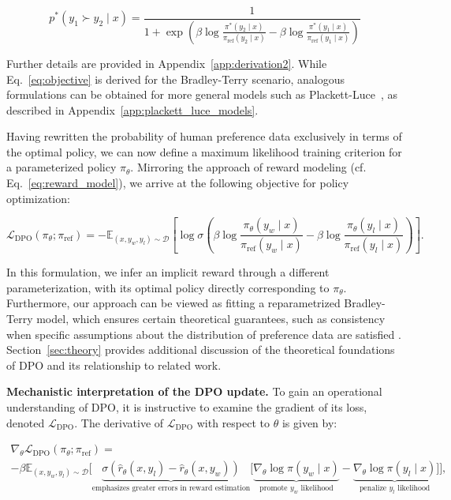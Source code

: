 \begin{equation}\label{eq:objective}
    p^*(y_1\succ y_2 \mid x)=\frac{1}{1 + \exp\left(\beta \log \frac{\pi^*(y_2\mid x)}{\pi_\text{ref}(y_2\mid x)} - \beta \log \frac{\pi^*(y_1\mid x)}{\pi_\text{ref}(y_1\mid x)}\right)}
\end{equation}

Further details are provided in Appendix~\ref{app:derivation2}. While Eq.~\ref{eq:objective} is derived for the Bradley-Terry scenario, analogous formulations can be obtained for more general models such as Plackett-Luce~\citep{plackett1975analysis, luce2012individual}, as described in Appendix~\ref{app:plackett_luce_models}.

Having rewritten the probability of human preference data exclusively in terms of the optimal policy, we can now define a maximum likelihood training criterion for a parameterized policy $\pi_\theta$. Mirroring the approach of reward modeling (cf. Eq.~\ref{eq:reward_model}), we arrive at the following objective for policy optimization:

\begin{equation}\label{eq:optimum_model}
    \mathcal{L}_\text{DPO}(\pi_{\theta}; \pi_\text{ref}) = -\mathbb{E}_{(x, y_w, y_l)\sim \mathcal{D}}\left[\log \sigma \left(\beta \log \frac{\pi_{\theta}(y_w\mid x)}{\pi_\text{ref}(y_w\mid x)} - \beta \log \frac{\pi_{\theta}(y_l\mid x)}{\pi_\text{ref}(y_l\mid x)}\right)\right].
\end{equation}

In this formulation, we infer an implicit reward through a different parameterization, with its optimal policy directly corresponding to $\pi_\theta$. Furthermore, our approach can be viewed as fitting a reparametrized Bradley-Terry model, which ensures certain theoretical guarantees, such as consistency when specific assumptions about the distribution of preference data are satisfied \cite{bong2022generalized}. Section~\ref{sec:theory} provides additional discussion of the theoretical foundations of DPO and its relationship to related work.

\textbf{Mechanistic interpretation of the DPO update.} To gain an operational understanding of DPO, it is instructive to examine the gradient of its loss, denoted $\mathcal{L}_\text{DPO}$. The derivative of $\mathcal{L}_\text{DPO}$ with respect to $\theta$ is given by:

\begin{multline*}\label{eq:gradient}
    \nabla_\theta \mathcal{L}_\text{DPO}(\pi_\theta;\pi_\text{ref}) = \\ -\beta\mathbb{E}_{(x, y_w, y_l) \sim \mathcal{D}} \bigg[\underbrace{\sigma(\hat{r}_\theta(x, y_l) - \hat{r}_\theta (x, y_w))}_\text{emphasizes greater errors in reward estimation}\bigg[\underbrace{\nabla_\theta\log \pi(y_w \mid x)}_\text{promote $y_w$ likelihood} - \underbrace{\nabla_\theta\log\pi(y_l \mid x)}_\text{penalize $y_l$ likelihood}\bigg]\bigg],
\end{multline*}

